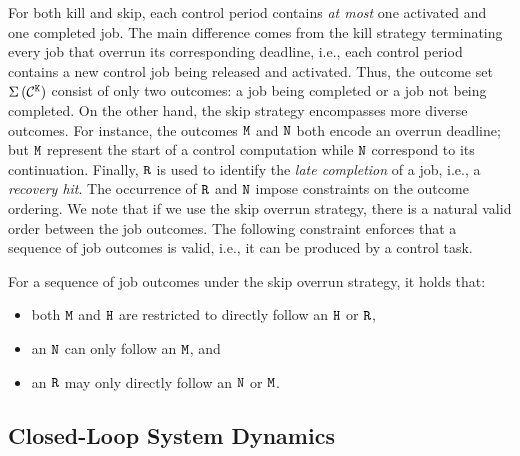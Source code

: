 For both kill and skip, each control period contains \emph{at most} one activated and one completed job.
The main difference comes from the kill strategy terminating every job that overrun its corresponding deadline, i.e., each control period contains a new control job being released and activated.
Thus, the outcome set $\Sigma\,({\mathcal{C}^{\texttt{K}}})$ consist of only two outcomes: a job being completed or a job not being completed.
On the other hand, the skip strategy encompasses more diverse outcomes.
For instance, the outcomes $\texttt{M}$ and $\texttt{N}$ both encode an overrun deadline; but $\texttt{M}$ represent the start of a control computation while $\texttt{N}$ correspond to its continuation.
Finally, $\texttt{R}$ is used to identify the \emph{late completion} of a job, i.e., a \emph{recovery hit}.
The occurrence of $\texttt{R}$ and $\texttt{N}$ impose constraints on the outcome ordering.
We note that if we use the skip overrun strategy, there is a natural valid order between the job outcomes.
The following constraint enforces that a sequence of job outcomes is valid, i.e., it can be produced by a control task.
%
\begin{rule_}%
    \label{rule:1}%
    For a sequence of job outcomes under the skip overrun strategy, it holds that: 
    \begin{itemize}
        \item both $\texttt{M}$ and $\texttt{H}$ are restricted to directly follow an $\texttt{H}$ or $\texttt{R}$,
        \item an $\texttt{N}$ can only follow an $\texttt{M}$, and
        \item an $\texttt{R}$ may only directly follow an $\texttt{N}$ or $\texttt{M}$.
    \end{itemize}
\end{rule_}

\subsection{Closed-Loop System Dynamics}%
\label{sec:dynamics}%

